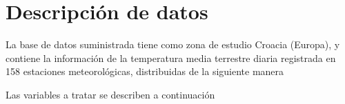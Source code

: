 \section{Descripción de datos}

La base de datos suministrada tiene como zona de estudio Croacia (Europa), y contiene la información
de la temperatura media terrestre diaria registrada en 158 estaciones meteorológicas, distribuidas de la siguiente manera



Las variables a tratar se describen a continuación





        


